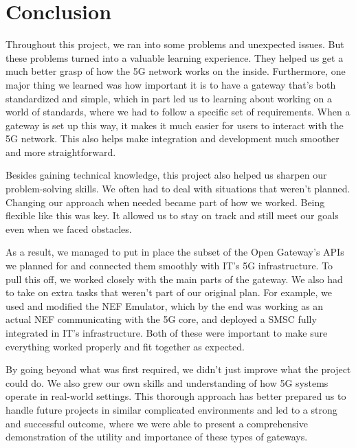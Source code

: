 \chapter{Conclusion}

Throughout this project, we ran into some problems and unexpected issues. But
these problems turned into a valuable learning experience. They helped us get a
much better grasp of how the 5G network works on the inside. Furthermore, one
major thing we learned was how important it is to have a gateway that's both
standardized and simple, which in part led us to learning about working on a
world of standards, where we had to follow a specific set of requirements. When
a gateway is set up this way, it makes it much easier for users to interact
with the 5G network. This also helps make integration and development much
smoother and more straightforward.

Besides gaining technical knowledge, this project also helped us sharpen our
problem-solving skills. We often had to deal with situations that weren’t
planned. Changing our approach when needed became part of how we worked. Being
flexible like this was key. It allowed us to stay on track and still meet our
goals even when we faced obstacles.

As a result, we managed to put in place the subset of the Open Gateway’s APIs
we planned for and connected them smoothly with IT’s 5G infrastructure. To pull
this off, we worked closely with the main parts of the gateway. We also had to
take on extra tasks that weren’t part of our original plan. For example, we
used and modified the NEF Emulator, which by the end was working as an actual
NEF communicating with the 5G core, and deployed a SMSC fully integrated in
IT's infrastructure. Both of these were important to make sure everything
worked properly and fit together as expected.

By going beyond what was first required, we didn’t just improve what the
project could do. We also grew our own skills and understanding of how 5G
systems operate in real-world settings. This thorough approach has better
prepared us to handle future projects in similar complicated environments and
led to a strong and successful outcome, where we were able to present a
comprehensive demonstration of the utility and importance of these types of
gateways.
